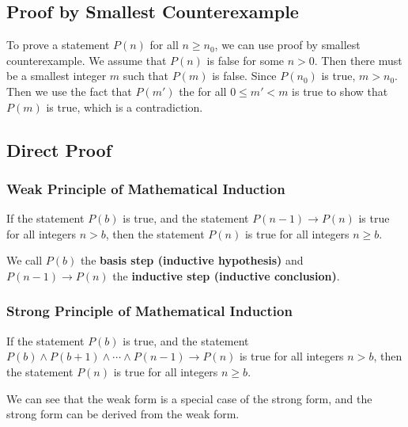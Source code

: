 \documentclass[a4paper,12pt]{article}
\begin{document}
\subsection{Proof by Smallest Counterexample}

To prove a statement $P(n)$ for all $n \geq n_0$, we can use proof by smallest counterexample.
We assume that $P(n)$ is false for some $n > 0$.
Then there must be a smallest integer $m$ such that $P(m)$ is false.
Since $P(n_0)$ is true, $m > n_0$.
Then we use the fact that $P(m')$ the for all $0 \leq m' < m$ is true to show that $P(m)$ is true, which is a contradiction.

\subsection{Direct Proof}

\subsubsection{Weak Principle of Mathematical Induction}

If the statement $P(b)$ is true, and the statement $P(n-1) \rightarrow P(n)$ is true for all integers $n > b$, then the statement $P(n)$ is true for all integers $n \geq b$.

We call $P(b)$ the \textbf{basis step (inductive hypothesis)} and $P(n-1) \rightarrow P(n)$ the \textbf{inductive step (inductive conclusion)}.

\subsubsection{Strong Principle of Mathematical Induction}

If the statement $P(b)$ is true, and the statement $P(b) \wedge P(b+1) \wedge \cdots \wedge P(n-1) \rightarrow P(n)$ is true for all integers $n > b$, then the statement $P(n)$ is true for all integers $n \geq b$.

We can see that the weak form is a special case of the strong form, and the strong form can be derived from the weak form.
\end{document}
